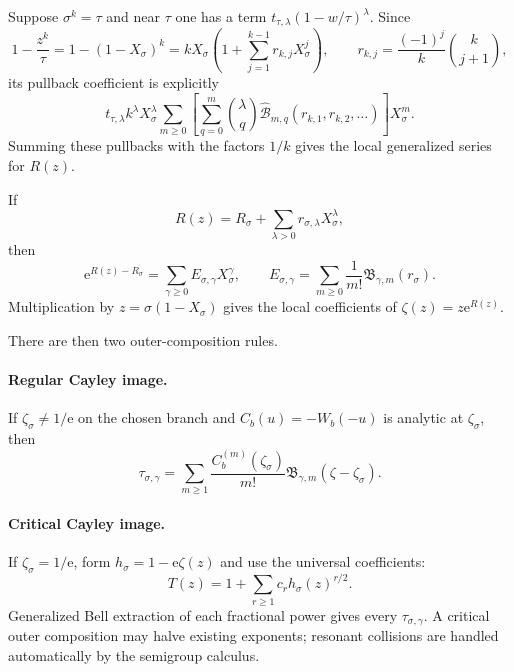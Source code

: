 \documentclass[11pt]{article}
\theoremstyle{definition}
\theoremstyle{remark}
\newcommand{\Bell}{\widehat{\mathcal B}}
\newcommand{\e}{\mathrm e}
\begin{document}
Suppose $\sigma^k=\tau$ and near $\tau$ one has a term
$t_{\tau,\lambda}(1-w/\tau)^\lambda$.  Since
\begin{equation}
 1-\frac{z^k}{\tau}=1-(1-X_\sigma)^k
 =kX_\sigma\left(1+\sum_{j=1}^{k-1}r_{k,j}X_\sigma^j\right),
 \qquad
 r_{k,j}=\frac{(-1)^j}{k}\binom{k}{j+1},
 \label{eq:pullback-coordinate}
\end{equation}
its pullback coefficient is explicitly
\begin{equation}
 t_{\tau,\lambda}k^\lambda X_\sigma^\lambda
 \sum_{m\geq0}
 \left[
 \sum_{q=0}^m\binom\lambda q
 \Bell_{m,q}(r_{k,1},r_{k,2},\ldots)
 \right]X_\sigma^m.
 \label{eq:pullback-coefficients}
\end{equation}
Summing these pullbacks with the factors $1/k$ gives the local generalized
series for $R(z)$.

If
\[
 R(z)=R_\sigma+\sum_{\lambda>0}r_{\sigma,\lambda}X_\sigma^\lambda,
\]
then
\begin{equation}
 \e^{R(z)-R_\sigma}
 =\sum_{\gamma\geq0}E_{\sigma,\gamma}X_\sigma^\gamma,
 \qquad
 E_{\sigma,\gamma}=
 \sum_{m\geq0}\frac1{m!}
 \mathfrak B_{\gamma,m}(r_\sigma).
 \label{eq:general-exp}
\end{equation}
Multiplication by $z=\sigma(1-X_\sigma)$ gives the local coefficients of
$\zeta(z)=z\e^{R(z)}$.

There are then two outer-composition rules.

\paragraph{Regular Cayley image.}
If $\zeta_\sigma\neq1/\e$ on the chosen branch and
$C_b(u)=-W_b(-u)$ is analytic at $\zeta_\sigma$, then
\begin{equation}
 \tau_{\sigma,\gamma}
 =\sum_{m\geq1}\frac{C_b^{(m)}(\zeta_\sigma)}{m!}
 \mathfrak B_{\gamma,m}(\zeta-\zeta_\sigma).
 \label{eq:regular-outer}
\end{equation}

\paragraph{Critical Cayley image.}
If $\zeta_\sigma=1/\e$, form
$h_\sigma=1-\e\zeta(z)$ and use the universal coefficients:
\begin{equation}
 T(z)=1+\sum_{r\geq1}c_rh_\sigma(z)^{r/2}.
 \label{eq:critical-outer}
\end{equation}
Generalized Bell extraction of each fractional power gives every
$\tau_{\sigma,\gamma}$.  A critical outer composition may halve existing
exponents; resonant collisions are handled automatically by the semigroup
calculus.
\end{document}
